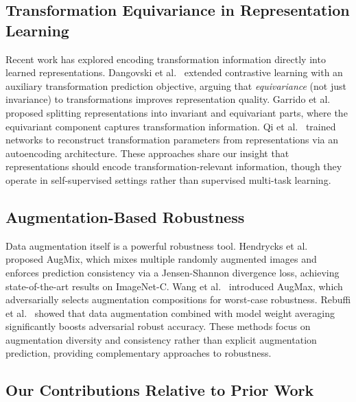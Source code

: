 \documentclass[11pt,a4paper]{article}
\begin{document}
\subsection{Transformation Equivariance in Representation Learning}

Recent work has explored encoding transformation information directly into learned representations. Dangovski et al.~\cite{dangovski2022essl} extended contrastive learning with an auxiliary transformation prediction objective, arguing that \emph{equivariance} (not just invariance) to transformations improves representation quality. Garrido et al.~\cite{garrido2023sie} proposed splitting representations into invariant and equivariant parts, where the equivariant component captures transformation information. Qi et al.~\cite{qi2019avt} trained networks to reconstruct transformation parameters from representations via an autoencoding architecture. These approaches share our insight that representations should encode transformation-relevant information, though they operate in self-supervised settings rather than supervised multi-task learning.

\subsection{Augmentation-Based Robustness}

Data augmentation itself is a powerful robustness tool. Hendrycks et al.~\cite{hendrycks2020augmix} proposed AugMix, which mixes multiple randomly augmented images and enforces prediction consistency via a Jensen-Shannon divergence loss, achieving state-of-the-art results on ImageNet-C. Wang et al.~\cite{wang2021augmax} introduced AugMax, which adversarially selects augmentation compositions for worst-case robustness. Rebuffi et al.~\cite{rebuffi2021augmentation} showed that data augmentation combined with model weight averaging significantly boosts adversarial robust accuracy. These methods focus on augmentation diversity and consistency rather than explicit augmentation prediction, providing complementary approaches to robustness.

\subsection{Our Contributions Relative to Prior Work}
\end{document}
